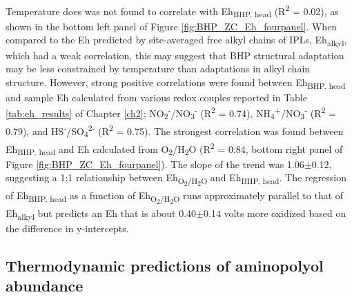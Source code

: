Temperature does was not found to correlate with Eh\textsubscript{BHP, head} (R\textsuperscript{2} = 0.02), as shown in the bottom left panel of Figure \ref{fig:BHP_ZC_Eh_fourpanel}. When compared to the Eh predicted by site-averaged free alkyl chains of IPLs, Eh\textsubscript{alkyl}, which had a weak correlation, this may suggest that BHP structural adaptation may be less constrained by temperature than adaptations in alkyl chain structure. However, strong positive correlations were found between Eh\textsubscript{BHP, head} and sample Eh calculated from various redox couples reported in Table \ref{tab:eh_results} of Chapter \ref{ch2}; NO\textsubscript{2}\textsuperscript{-}/NO\textsubscript{3}\textsuperscript{-} (R\textsuperscript{2} = 0.74), NH\textsubscript{4}\textsuperscript{+}/NO\textsubscript{3}\textsuperscript{-} (R\textsuperscript{2} = 0.79), and HS\textsuperscript{-}/SO\textsubscript{4}\textsuperscript{2-} (R\textsuperscript{2} = 0.75). The strongest correlation was found between Eh\textsubscript{BHP, head} and Eh calculated from O\textsubscript{2}/H\textsubscript{2}O (R\textsuperscript{2} = 0.84, bottom right panel of Figure \ref{fig:BHP_ZC_Eh_fourpanel}). The slope of the trend was 1.06$\pm$0.12, suggesting a 1:1 relationship between Eh\textsubscript{O\textsubscript{2}/H\textsubscript{2}O} and Eh\textsubscript{BHP, head}. The regression of Eh\textsubscript{BHP, head} as a function of Eh\textsubscript{O\textsubscript{2}/H\textsubscript{2}O} runs approximately parallel to that of Eh\textsubscript{alkyl} but predicts an Eh that is about 0.40$\pm$0.14 volts more oxidized based on the difference in y-intercepts.

\subsection{Thermodynamic predictions of aminopolyol abundance}


